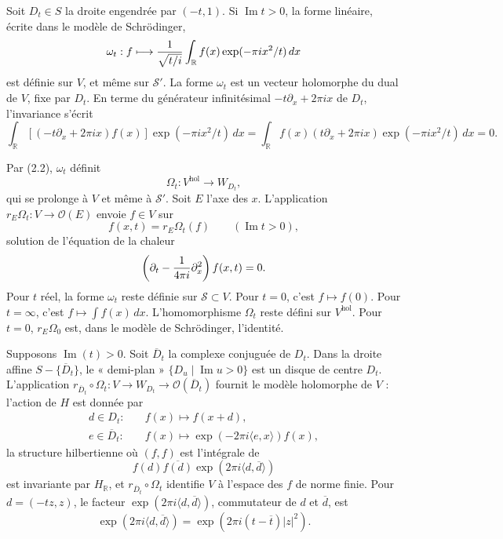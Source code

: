 \documentclass[11pt]{article}
\newcommand{\R}{\mathbb R}
\newcommand{\cO}{\mathcal O}
\newcommand{\dd}{\,d}
\begin{document}
Soit $D_t\in S$ la droite engendrée par $(-t,1)$. Si $\operatorname{Im}t>0$, la forme linéaire, écrite dans le modèle de Schrödinger,
\[
\omega_t:f\longmapsto {1\over\sqrt{t/i}}\int_\R f(x)\exp(-\pi ix^2/t)\dd x
\]
est définie sur $V$, et même sur $\mathscr S'$. La forme $\omega_t$ est un vecteur holomorphe du dual de $V$, fixe par $D_t$. En terme du générateur infinitésimal $-t\partial_x+2\pi ix$ de $D_t$, l'invariance s'écrit
\[
\int_\R[(-t\partial_x+2\pi ix)f(x)]\exp(-\pi ix^2/t)\dd x
=\int_\R f(x)(t\partial_x+2\pi ix)\exp(-\pi ix^2/t)\dd x=0.
\]

Par (2.2), $\omega_t$ définit
\[
\Omega_t:V^{\mathrm{hol}}\longrightarrow W_{D_t},
\]
qui se prolonge à $V$ et même à $\mathscr S'$. Soit $E$ l'axe des $x$. L'application $r_E\Omega_t:V\to\cO(E)$ envoie $f\in V$ sur
\[
f(x,t)=r_E\Omega_t(f)\qquad (\operatorname{Im}t>0),
\]
solution de l'équation de la chaleur
\[
\left(\partial_t-{1\over4\pi i}\partial_x^2\right)f(x,t)=0.
\]
Pour $t$ réel, la forme $\omega_t$ reste définie sur $\mathscr S\subset V$. Pour $t=0$, c'est $f\mapsto f(0)$. Pour $t=\infty$, c'est $f\mapsto\int f(x)\dd x$. L'homomorphisme $\Omega_t$ reste défini sur $V^{\mathrm{hol}}$. Pour $t=0$, $r_E\Omega_0$ est, dans le modèle de Schrödinger, l'identité.

Supposons $\operatorname{Im}(t)>0$. Soit $\overline D_t$ la complexe conjuguée de $D_t$. Dans la droite affine $S-\{\overline D_t\}$, le « demi-plan » $\{D_u\mid\operatorname{Im}u>0\}$ est un disque de centre $D_t$. L'application $r_{\overline D_t}\circ\Omega_t:V\to W_{D_t}\to\cO(\overline D_t)$ fournit le modèle holomorphe de $V$ : l'action de $H$ est donnée par
\[
\begin{aligned}
d\in D_t:&\quad f(x)\longmapsto f(x+d),\\
e\in\overline D_t:&\quad f(x)\longmapsto\exp(-2\pi i\langle e,x\rangle)f(x),
\end{aligned}
\]
la structure hilbertienne où $(f,f)$ est l'intégrale de
\[
f(d)\overline{f(d)}\exp(2\pi i\langle d,\overline d\rangle)
\]
est invariante par $H_\R$, et $r_{\overline D_t}\circ\Omega_t$ identifie $V$ à l'espace des $f$ de norme finie. Pour $d=(-tz,z)$, le facteur $\exp(2\pi i\langle d,\overline d\rangle)$, commutateur de $d$ et $\overline d$, est
\[
\exp(2\pi i\langle d,\overline d\rangle)=\exp(2\pi i(t-\overline t)|z|^2).
\]
\end{document}
